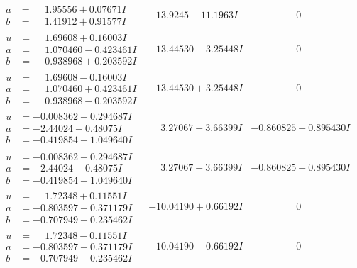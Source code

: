 \documentclass[1p]{elsarticle_modified}
\theoremstyle{definition}
\begin{document}
$$\begin{array}{c|c|c}
\begin{aligned}
a &= \phantom{-}1.95556 + 0.07671 I \\
b &= \phantom{-}1.41912 + 0.91577 I\end{aligned}
 & -13.9245 - 11.1963 I & \phantom{-0.000000 } 0 \\ \hline\begin{aligned}
u &= \phantom{-}1.69608 + 0.16003 I \\
a &= \phantom{-}1.070460 - 0.423461 I \\
b &= \phantom{-}0.938968 + 0.203592 I\end{aligned}
 & -13.44530 - 3.25448 I & \phantom{-0.000000 } 0 \\ \hline\begin{aligned}
u &= \phantom{-}1.69608 - 0.16003 I \\
a &= \phantom{-}1.070460 + 0.423461 I \\
b &= \phantom{-}0.938968 - 0.203592 I\end{aligned}
 & -13.44530 + 3.25448 I & \phantom{-0.000000 } 0 \\ \hline\begin{aligned}
u &= -0.008362 + 0.294687 I \\
a &= -2.44024 - 0.48075 I \\
b &= -0.419854 + 1.049640 I\end{aligned}
 & \phantom{-}3.27067 + 3.66399 I & -0.860825 - 0.895430 I \\ \hline\begin{aligned}
u &= -0.008362 - 0.294687 I \\
a &= -2.44024 + 0.48075 I \\
b &= -0.419854 - 1.049640 I\end{aligned}
 & \phantom{-}3.27067 - 3.66399 I & -0.860825 + 0.895430 I \\ \hline\begin{aligned}
u &= \phantom{-}1.72348 + 0.11551 I \\
a &= -0.803597 + 0.371179 I \\
b &= -0.707949 - 0.235462 I\end{aligned}
 & -10.04190 + 0.66192 I & \phantom{-0.000000 } 0 \\ \hline\begin{aligned}
u &= \phantom{-}1.72348 - 0.11551 I \\
a &= -0.803597 - 0.371179 I \\
b &= -0.707949 + 0.235462 I\end{aligned}
 & -10.04190 - 0.66192 I & \phantom{-0.000000 } 0 \\ \hline\begin{aligned}

\end{aligned}
\end{array}$$
\end{document}
